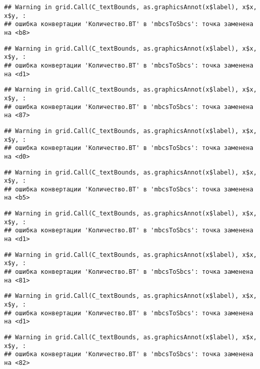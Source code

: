 \documentclass[
]{article}
\begin{document}
\begin{verbatim}
## Warning in grid.Call(C_textBounds, as.graphicsAnnot(x$label), x$x, x$y, :
## ошибка конвертации 'Количество.ВТ' в 'mbcsToSbcs': точка заменена на <b8>
\end{verbatim}

\begin{verbatim}
## Warning in grid.Call(C_textBounds, as.graphicsAnnot(x$label), x$x, x$y, :
## ошибка конвертации 'Количество.ВТ' в 'mbcsToSbcs': точка заменена на <d1>
\end{verbatim}

\begin{verbatim}
## Warning in grid.Call(C_textBounds, as.graphicsAnnot(x$label), x$x, x$y, :
## ошибка конвертации 'Количество.ВТ' в 'mbcsToSbcs': точка заменена на <87>
\end{verbatim}

\begin{verbatim}
## Warning in grid.Call(C_textBounds, as.graphicsAnnot(x$label), x$x, x$y, :
## ошибка конвертации 'Количество.ВТ' в 'mbcsToSbcs': точка заменена на <d0>
\end{verbatim}

\begin{verbatim}
## Warning in grid.Call(C_textBounds, as.graphicsAnnot(x$label), x$x, x$y, :
## ошибка конвертации 'Количество.ВТ' в 'mbcsToSbcs': точка заменена на <b5>
\end{verbatim}

\begin{verbatim}
## Warning in grid.Call(C_textBounds, as.graphicsAnnot(x$label), x$x, x$y, :
## ошибка конвертации 'Количество.ВТ' в 'mbcsToSbcs': точка заменена на <d1>
\end{verbatim}

\begin{verbatim}
## Warning in grid.Call(C_textBounds, as.graphicsAnnot(x$label), x$x, x$y, :
## ошибка конвертации 'Количество.ВТ' в 'mbcsToSbcs': точка заменена на <81>
\end{verbatim}

\begin{verbatim}
## Warning in grid.Call(C_textBounds, as.graphicsAnnot(x$label), x$x, x$y, :
## ошибка конвертации 'Количество.ВТ' в 'mbcsToSbcs': точка заменена на <d1>
\end{verbatim}

\begin{verbatim}
## Warning in grid.Call(C_textBounds, as.graphicsAnnot(x$label), x$x, x$y, :
## ошибка конвертации 'Количество.ВТ' в 'mbcsToSbcs': точка заменена на <82>
\end{verbatim}
\end{document}
